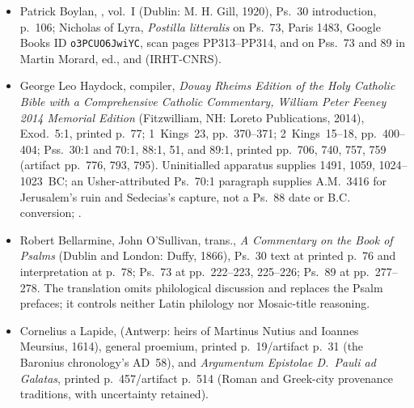 {\begin{itemize}[leftmargin=1.1em,labelsep=0.35em,itemsep=0em,topsep=0.15em,parsep=0pt]
\item Patrick Boylan,
, vol.~I (Dublin: M. H. Gill, 1920), Ps.~30 introduction, p.~106;
Nicholas of Lyra, \emph{Postilla litteralis} on Ps.~73, Paris 1483,
Google Books ID \texttt{o3PCUO6JwiYC}, scan pages PP313--PP314, and on
Pss.~73 and 89 in Martin Morard, ed.,
and
 (IRHT-CNRS).

\item George Leo Haydock, compiler, \emph{Douay Rheims Edition of the Holy
Catholic Bible with a Comprehensive Catholic Commentary, William Peter Feeney
2014 Memorial Edition}
(Fitzwilliam, NH: Loreto Publications, 2014), Exod.~5:1, printed p.~77;
1~Kings~23, pp.~370--371; 2~Kings~15--18, pp.~400--404; Pss.~30:1 and
70:1, 88:1, 51, and 89:1, printed pp.~706, 740, 757, 759 (artifact pp.~776,
793, 795). Uninitialled apparatus supplies 1491, 1059, 1024--1023~BC; an
Usher-attributed Ps.~70:1 paragraph supplies A.M.~3416 for Jerusalem's ruin
and Sedecias's capture, not a Ps.~88 date or B.C. conversion;
.

\item Robert Bellarmine, John O'Sullivan, trans., \emph{A Commentary on the Book of
Psalms} (Dublin and London: Duffy, 1866), Ps.~30 text at printed p.~76 and
interpretation at p.~78; Ps.~73 at pp.~222--223, 225--226; Ps.~89 at
pp.~277--278. The translation omits philological discussion and replaces the
Psalm prefaces; it controls neither Latin philology nor Mosaic-title reasoning.

\item Cornelius a Lapide,
(Antwerp: heirs of Martinus Nutius and Ioannes Meursius, 1614), general
proemium, printed p.~19/artifact p.~31 (the Baronius chronology's AD~58), and
\emph{Argumentum Epistolae D.~Pauli ad Galatas}, printed p.~457/artifact
p.~514 (Roman and Greek-city provenance traditions, with uncertainty retained).


\end{itemize}}
